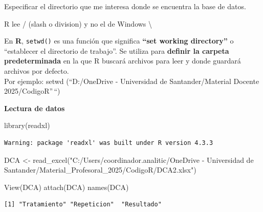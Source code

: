 \documentclass[
  letterpaper,
  DIV=11,
  numbers=noendperiod]{scrreprt}
\newenvironment{Shaded}{\begin{snugshade}}{\end{snugshade}}
\newcommand{\FunctionTok}[1]{\textcolor[rgb]{0.28,0.35,0.67}{#1}}
\newcommand{\NormalTok}[1]{\textcolor[rgb]{0.00,0.23,0.31}{#1}}
\newcommand{\OtherTok}[1]{\textcolor[rgb]{0.00,0.23,0.31}{#1}}
\newcommand{\StringTok}[1]{\textcolor[rgb]{0.13,0.47,0.30}{#1}}
\begin{document}
Especificar el directorio que me interesa donde se encuentra la base de
datos.

\begin{tcolorbox}[enhanced jigsaw, toptitle=1mm, colbacktitle=quarto-callout-tip-color!10!white, breakable, opacityback=0, toprule=.15mm, coltitle=black, colframe=quarto-callout-tip-color-frame, bottomtitle=1mm, bottomrule=.15mm, titlerule=0mm, title=\textcolor{quarto-callout-tip-color}{\faLightbulb}\hspace{0.5em}{Antes e inciar}, colback=white, arc=.35mm, rightrule=.15mm, leftrule=.75mm, left=2mm, opacitybacktitle=0.6]

R lee / (slash o division) y no el de Windows \textbackslash{}

En \textbf{R}, \texttt{setwd()} es una función que significa
\textbf{``set working directory''} o ``establecer el directorio de
trabajo''. Se utiliza para \textbf{definir la carpeta predeterminada} en
la que R buscará archivos para leer y donde guardará archivos por
defecto.\\

Por ejemplo: setwd (``D:/OneDrive - Universidad de Santander/Material
Docente 2025/CodigoR''\,``)

\end{tcolorbox}

\textbf{Lectura de datos}

\begin{Shaded}
\begin{Highlighting}[]
\FunctionTok{library}\NormalTok{(readxl)}
\end{Highlighting}
\end{Shaded}

\begin{verbatim}
Warning: package 'readxl' was built under R version 4.3.3
\end{verbatim}

\begin{Shaded}
\begin{Highlighting}[]
\NormalTok{DCA }\OtherTok{\textless{}{-}} \FunctionTok{read\_excel}\NormalTok{(}\StringTok{"C:/Users/coordinador.analitic/OneDrive {-} Universidad de Santander/Material\_Profesoral\_2025/CodigoR/DCA2.xlsx"}\NormalTok{)}

\FunctionTok{View}\NormalTok{(DCA)}
\FunctionTok{attach}\NormalTok{(DCA)}
\FunctionTok{names}\NormalTok{(DCA)}
\end{Highlighting}
\end{Shaded}

\begin{verbatim}
[1] "Tratamiento" "Repeticion"  "Resultado"  
\end{verbatim}
\end{document}
